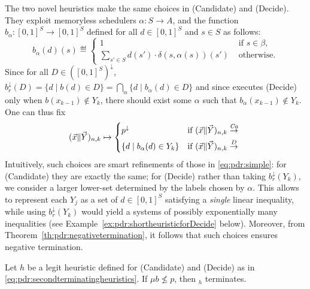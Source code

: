 The two novel heuristics make the same choices in (Candidate) and (Decide). They exploit memoryless schedulers $\alpha \colon S \to A$, and the function $b_{\alpha} \colon [0, 1]^S \to [0, 1]^S$ defined for all $d\in [0, 1]^S $ and $s\in S$ as follows:
\begin{equation}\label{def:pdr:balpha}
	b_{\alpha}(d)(s) \eqdef \begin{cases}
		1                                                   & \text{ if } s \in \beta, \\
		\sum_{s'\in S} d(s') \cdot \delta(s, \alpha(s))(s') & \text{ otherwise}.
	\end{cases}
\end{equation}
Since for all $D\in ([0,1]^S)^\downarrow$, $b^\downarrow_r (D) = \{d \mid b(d) \in D\} = \bigcap_{\alpha}\{d \mid b_{\alpha} (d)\in D\}$ and since {\ADPDR} executes (Decide) only when $b(x_{k-1}) \notin Y_k$, there should exist some $\alpha$ such that $b_{\alpha} (x_{k-1})\notin Y_k$. One can thus fix
\begin{equation}\label{eq:pdr:secondterminatingheuristics}
	( \vec{x} \| \vec{Y} )_{n,k} \mapsto
	\begin{cases*}
		p^\downarrow                     & if $( \vec{x} \| \vec{Y} )_{n,k} \tr{\mathit{Ca}}$ \\
		\{d \mid b_{\alpha}(d) \in Y_k\} & if $( \vec{x} \| \vec{Y} )_{n,k} \tr{D}$
	\end{cases*}
\end{equation}
Intuitively, such choices are smart refinements of those in \eqref{eq:pdr:simple}: for (Candidate) they are exactly the same; for (Decide) rather than taking $b^\downarrow_r (Y_k)$, we consider a larger lower-set determined by the labels chosen by $\alpha$. This allows to represent each $Y_j$ as a set of $d\in [0, 1]^S $ satisfying a \emph{single} linear inequality, while using $b^\downarrow_r (Y_k)$ would yield a systems of possibly exponentially many inequalities (see Example~\ref{ex:pdr:shortheuristicforDecide} below). Moreover, from Theorem~\ref{th:pdr:negativetermination}, it follows that such choices ensures negative termination.

\begin{corollary}\label{cor:pdr:ADPDRtermination}
	Let $h$ be a legit heuristic defined for (Candidate) and (Decide) as in \eqref{eq:pdr:secondterminatingheuristics}.
	If $\mu b \not \leq p$, then \emph{\ADPDR}$_h$ terminates.
\end{corollary}

